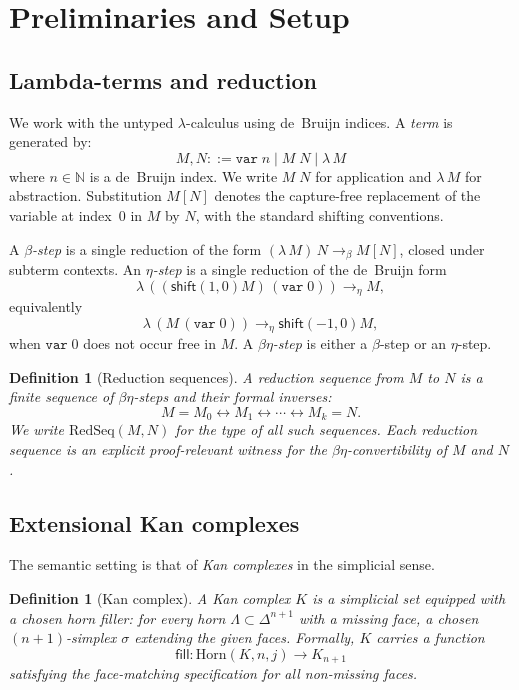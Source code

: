 \documentclass[webpdf,traditional,large,numbered]{oup-authoring-template}
\theoremstyle{thmstyleone}%
\theoremstyle{thmstyletwo}%
\theoremstyle{thmstylethree}%
\newtheorem{definition}[theorem]{Definition}
\newcommand{\ReductionSeq}{\mathrm{RedSeq}}
\begin{document}
\section{Preliminaries and Setup}\label{sec:prelim}

\subsection{Lambda-terms and reduction}

We work with the untyped $\lambda$-calculus using de~Bruijn indices. A
\emph{term} is generated by:
\[
  M, N ::= \mathtt{var}\;n \mid M\;N \mid \lambda\,M
\]
where $n \in \mathbb{N}$ is a de~Bruijn index. We write $M\;N$ for application
and $\lambda\,M$ for abstraction. Substitution $M[N]$ denotes the capture-free
replacement of the variable at index~$0$ in $M$ by $N$, with the standard
shifting conventions.

A \emph{$\beta$-step} is a single reduction of the form $(\lambda\,M)\,N
\to_\beta M[N]$, closed under subterm contexts. An \emph{$\eta$-step} is a
single reduction of the de~Bruijn form
\[
  \lambda\,((\mathsf{shift}(1,0)M)\,(\mathtt{var}\;0)) \to_\eta M,
\]
equivalently
\[
  \lambda\,(M\,(\mathtt{var}\;0)) \to_\eta \mathsf{shift}(-1,0)M,
\]
when $\mathtt{var}\;0$ does not occur free in $M$. A \emph{$\beta\eta$-step} is
either a $\beta$-step or an $\eta$-step.

\begin{definition}[Reduction sequences]
  A \emph{reduction sequence} from $M$ to $N$ is a finite sequence of
  $\beta\eta$-steps and their formal inverses:
  \[
    M = M_0 \leftrightarrow M_1 \leftrightarrow \cdots \leftrightarrow M_k = N.
  \]
  We write $\ReductionSeq(M,N)$ for the type of all such sequences. Each
  reduction sequence is an explicit proof-relevant witness for the
  $\beta\eta$-convertibility of $M$ and $N$.
\end{definition}

\subsection{Extensional Kan complexes}

The semantic setting is that of \emph{Kan complexes} in the simplicial sense.

\begin{definition}[Kan complex]
  A \emph{Kan complex} $K$ is a simplicial set equipped with a chosen horn
  filler: for every horn $\Lambda \subset \Delta^{n+1}$ with a missing face, a
  chosen $(n+1)$-simplex $\sigma$ extending the given faces. Formally, $K$
  carries a function
  \[
    \mathsf{fill} : \mathrm{Horn}(K, n, j) \to K_{n+1}
  \]
  satisfying the face-matching specification for all non-missing faces.
\end{definition}
\end{document}
